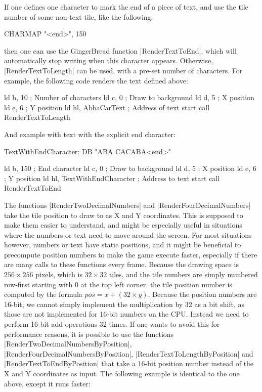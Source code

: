 \documentclass[11pt]{book}
\begin{document}
If one defines one character to mark the end of a piece of text, and use the tile number of some non-text tile, like the following:

\begin{code}
CHARMAP "<end>", 150
\end{code}

then one can use the GingerBread function |RenderTextToEnd|, which will automatically stop writing when this character appears. Otherwise, |RenderTextToLength| can be used, with a pre-set number of characters. For example, the following code renders the text defined above:

\begin{code}
ld b, 10 ; Number of characters
ld c, 0 ; Draw to background
ld d, 5 ; X position 
ld e, 6 ; Y position
ld hl, AbbaCarText ; Address of text start
call RenderTextToLength
\end{code}

And example with text with the explicit end character:

\begin{code}
TextWithEndCharacter:
DB "ABA CACABA<end>"

ld b, 150 ; End character
ld c, 0 ; Draw to background
ld d, 5 ; X position
ld e, 6 ; Y position
ld hl, TextWithEndCharacter ; Address to text start
call RenderTextToEnd
\end{code}

The functions |RenderTwoDecimalNumbers| and |RenderFourDecimalNumbers| take the tile position to draw to as X and Y coordinates. This is supposed to make them easier to understand, and might be especially useful in situations where the numbers or text need to move around the screen. For most situations however, numbers or text have static positions, and it might be beneficial to precompute position numbers to make the game execute faster, especially if there are many calls to these functions every frame. Because the drawing space is $256\times256$ pixels, which is $32\times32$ tiles, and the tile numbers are simply numbered row-first starting with 0 at the top left corner, the tile position number is computed by the formula $pos = x + (32 \times y)$. Because the position numbers are 16-bit, we cannot simply implement the multiplication by 32 as a bit shift, as those are not implemented for 16-bit numbers on the CPU. Instead we need to perform 16-bit add operations 32 times. If one wants to avoid this for performance reasons, it is possible to use the functions |RenderTwoDecimalNumbersByPosition|, |RenderFourDecimalNumbersByPosition|, |RenderTextToLengthByPosition| and |RenderTextToEndByPosition| that take a 16-bit position number instead of the X and Y coordinates as input. The following example is identical to the one above, except it runs faster:
\end{document}
